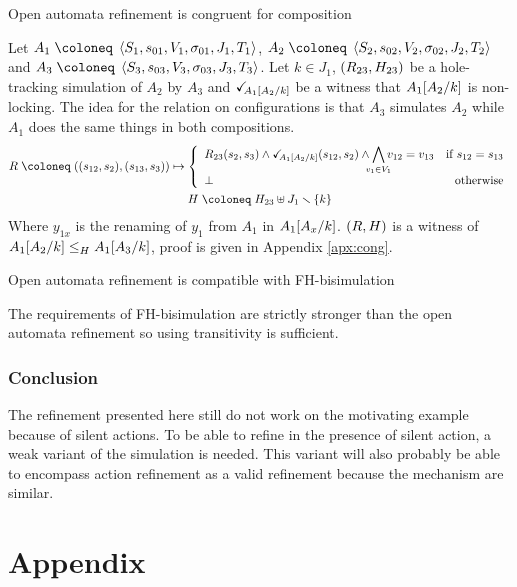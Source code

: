 \documentclass{article}
\begin{document}
\begin{thm} Open automata refinement is congruent for composition \end{thm}
Let \(A_1 \defobject \OAg[1]\), \(A_2 \defobject \OAg[2]\) and \(A_3 \defobject \OAg[3]\).
Let \(k \in J_1\), \(\mpar{R_{23}, H_{23}}\) be a hole-tracking simulation of \(A_2\) by \(A_3\) and \(\reach{A_1\subst{A_2}{k}}\) be a witness that \(A_1\subst{A_2}{k}\) is non-locking.
The idea for the relation on configurations is that \(A_3\) simulates \(A_2\) while \(A_1\) does the same things in both compositions.
\begin{gather*}
	R \defobject \mpar{\mpar{s_{12}, s_2}, \mpar{s_{13}, s_3}} \mapsto \choice{R_{23}\mpar{s_2, s_3} \wedge \reach{A_1\subst{A_2}{k}}\mpar{s_{12}, s_2} \wedge \bigwedge_\subbox{v_1 \in V_1} v_{12} = v_{13} & \text{if } s_{12} = s_{13} \\ \bot & \text{otherwise}} \\
	H \defobject H_{23} \uplus J_1 \setminus \mbrc{k}
\end{gather*}
Where \(y_{1x}\) is the renaming of \(y_1\) from \(A_1\) in \(A_1\subst{A_x}{k}\).
\(\mpar{R, H}\) is a witness of \(\wrel{A_1\subst{A_2}{k}}{A_1\subst{A_3}{k}}{H}\), proof is given in Appendix \ref{apx:cong}.
\begin{thm} Open automata refinement is compatible with FH-bisimulation \end{thm}
The requirements of FH-bisimulation are strictly stronger than the open automata refinement so using transitivity is sufficient.



\section{Conclusion}\label{sec:ccl}

The refinement presented here still do not work on the motivating example because of silent actions.
To be able to refine in the presence of silent action, a weak variant of the simulation is needed.
This variant will also probably be able to encompass action refinement as a valid refinement because the mechanism are similar.


\pagebreak



\pagebreak
\appendix
\part*{Appendix}
\end{document}
